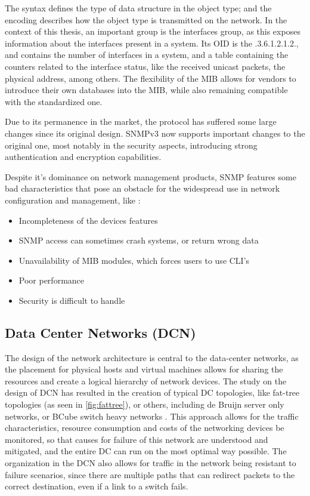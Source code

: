 \par The syntax defines the type of data structure in the object type; and the encoding describes how the object type is transmitted on the network. In the context
of this thesis, an important group is the interfaces group, as this exposes information about the interfaces present in a system. Its OID is the .3.6.1.2.1.2., 
and contains the number of interfaces in a system, and a table containing the counters related to the interface status, like the received unicast packets, the 
physical address, among others. The flexibility of the MIB allows for vendors to introduce their own databases into the MIB, while also remaining compatible 
with the standardized one.

\par Due to its permanence in the market, the protocol has suffered some large changes since its original design. SNMPv3 now supports important changes to the
original one, most notably in the security aspects, introducing strong authentication and encryption capabilities.

\par Despite it's dominance on network management products, SNMP features some bad characteristics that pose an obstacle for the widespread use in network
configuration and management, like \cite{schonwalder_overview_2003}: 

\begin {itemize}
    \item Incompleteness of the devices features
    \item SNMP access can sometimes crash systems, or return wrong data
    \item Unavailability of MIB modules, which forces users to use CLI's
    \item Poor performance 
    \item Security is difficult to handle
\end {itemize}

\subsection {Data Center Networks (DCN)}

\par The design of the network architecture is central to the data-center networks, as the placement for physical hosts and virtual machines allows for sharing the 
resources and create a logical hierarchy of network devices. The study on the design of DCN has resulted in the creation of typical DC topologies, like fat-tree
topologies (as seen in \ref{fig:fattree}), or others, including de Bruijn server only networks, or BCube switch heavy networks \cite{popa_cost_2010}. This approach
allows for the traffic characteristics, resource consumption and costs of the networking devices be monitored, so that causes for failure of this network are
understood and mitigated, and the entire DC can run on the most optimal way possible. The organization in the DCN also allows for traffic in the network being
resistant to failure scenarios, since there are multiple paths that can redirect packets to the correct destination, even if a link to a switch fails.

